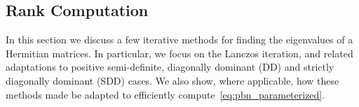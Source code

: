 \documentclass[10pt]{article}
\newcommand{\+}{%
	\raisebox{0.18ex}{\scaleobj{0.55}{+}}
}
\begin{document}

\subsection{Rank Computation}
In this section we discuss a few iterative methods for finding the eigenvalues of a Hermitian matrices. In particular, we focus on the Lanczos iteration, and related adaptations to positive semi-definite, diagonally dominant (DD) and strictly diagonally dominant (SDD) cases. We also show, where applicable, how these methods made be adapted to efficiently compute~\eqref{eq:pbn_parameterized}.

 
\end{document}
